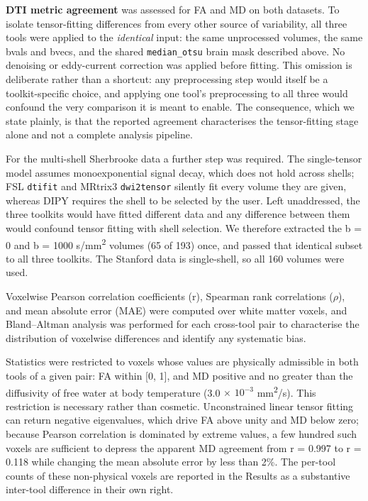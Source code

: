 \documentclass[12pt,a4paper]{article}
\begin{document}
\textbf{DTI metric agreement} was assessed for FA and MD on both datasets. To isolate tensor-fitting differences from every other source of variability, all three tools were applied to the \emph{identical} input: the same unprocessed volumes, the same bvals and bvecs, and the shared \texttt{median\_otsu} brain mask described above. No denoising or eddy-current correction was applied before fitting. This omission is deliberate rather than a shortcut: any preprocessing step would itself be a toolkit-specific choice, and applying one tool's preprocessing to all three would confound the very comparison it is meant to enable. The consequence, which we state plainly, is that the reported agreement characterises the tensor-fitting stage alone and not a complete analysis pipeline.

For the multi-shell Sherbrooke data a further step was required. The single-tensor model assumes monoexponential signal decay, which does not hold across shells; FSL \texttt{dtifit} and MRtrix3 \texttt{dwi2tensor} silently fit every volume they are given, whereas DIPY requires the shell to be selected by the user. Left unaddressed, the three toolkits would have fitted different data and any difference between them would confound tensor fitting with shell selection. We therefore extracted the b = 0 and b = 1000 s/mm\textsuperscript{2} volumes (65 of 193) once, and passed that identical subset to all three toolkits. The Stanford data is single-shell, so all 160 volumes were used.

Voxelwise Pearson correlation coefficients (r), Spearman rank correlations ($\rho$), and mean absolute error (MAE) were computed over white matter voxels, and Bland--Altman analysis was performed for each cross-tool pair to characterise the distribution of voxelwise differences and identify any systematic bias.

Statistics were restricted to voxels whose values are physically admissible in both tools of a given pair: FA within {[}0, 1{]}, and MD positive and no greater than the diffusivity of free water at body temperature (3.0 $\times$ $10^{-3}$ mm\textsuperscript{2}/s). This restriction is necessary rather than cosmetic. Unconstrained linear tensor fitting can return negative eigenvalues, which drive FA above unity and MD below zero; because Pearson correlation is dominated by extreme values, a few hundred such voxels are sufficient to depress the apparent MD agreement from r = 0.997 to r = 0.118 while changing the mean absolute error by less than 2\%. The per-tool counts of these non-physical voxels are reported in the Results as a substantive inter-tool difference in their own right.
\end{document}
